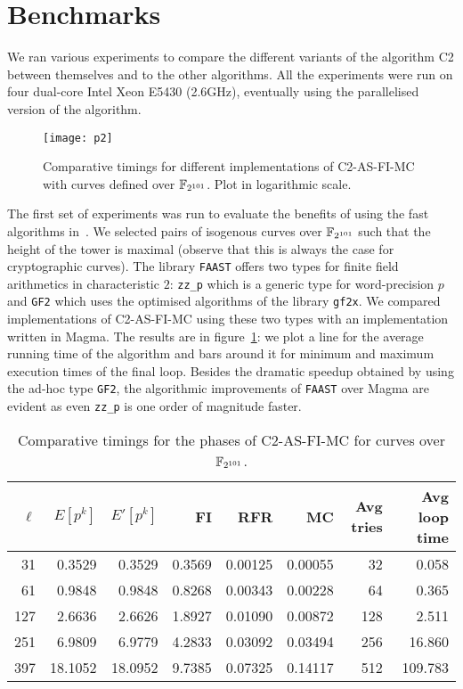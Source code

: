 \section{Benchmarks}
\label{sec:benchmarks}
We ran various experiments to compare the different variants of the
algorithm C2 between themselves and to the other algorithms. All the
experiments were run on four dual-core Intel Xeon E5430 (2.6GHz),
eventually using the parallelised version of the algorithm.

\begin{figure}
  \centering
  \texttt{[image: p2]}
  \caption{Comparative timings for different implementations of C2-AS-FI-MC with curves defined over $\mathbb{F}_{2^{101}}$. Plot in logarithmic scale.}
  \label{fig:2-101}
\end{figure}

The first set of experiments was run to evaluate the benefits of using
the fast algorithms in~\cite{DFS09}. We selected pairs of isogenous
curves over $\mathbb{F}_{2^{101}}$ such that the height of the tower is
maximal (observe that this is always the case for cryptographic
curves). The library \texttt{FAAST} offers two types for finite field
arithmetics in characteristic $2$: \texttt{zz\_p} which is a generic
type for word-precision $p$ and \texttt{GF2} which uses the optimised
algorithms of the library \texttt{gf2x}. We compared implementations
of C2-AS-FI-MC using these two types with an implementation written in
Magma. The results are in figure~\ref{fig:2-101}: we plot a line for
the average running time of the algorithm and bars around it for
minimum and maximum execution times of the final loop. Besides the
dramatic speedup obtained by using the ad-hoc type \texttt{GF2}, the
algorithmic improvements of \texttt{FAAST} over Magma are evident as
even \texttt{zz\_p} is one order of magnitude faster.

\begin{table}
  \centering
  \begin{tabular}{r r r r r r r r}
    \hline
    $\ell$ & $E[p^k]$ & $E'[p^k]$ & FI & RFR & MC & Avg tries & Avg loop time\\
    \hline
    31  &  0.3529 &  0.3529 & 0.3569 & 0.00125 & 0.00055 &  32 &   0.058\\
    61  &  0.9848 &  0.9848 & 0.8268 & 0.00343 & 0.00228 &  64 &   0.365\\
    127 &  2.6636 &  2.6626 & 1.8927 & 0.01090 & 0.00872 & 128 &   2.511\\
    251 &  6.9809 &  6.9779 & 4.2833 & 0.03092 & 0.03494 & 256 &  16.860\\
    397 & 18.1052 & 18.0952 & 9.7385 & 0.07325 & 0.14117 & 512 & 109.783\\
    \hline
  \end{tabular}
  \caption{Comparative timings for the phases of C2-AS-FI-MC for curves over $\mathbb{F}_{2^{101}}$.}
  \label{tab:C2}
\end{table}

